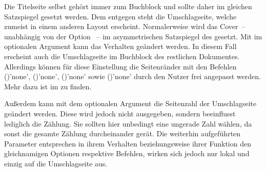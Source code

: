 \begin{Declaration*}{}
\begin{Declaration*}{}
\begin{Declaration*}{}
\begin{Declaration}
\begin{Declaration}[v2.02]{%
}
\begin{Declaration}{}
\begin{Declaration}[v2.02]{}{%
}
\begin{Declaration}[v2.03]{}{%
}
\begin{Declaration}[v2.03]{}{%
}
\begin{Declaration}[v2.03]{%
}{}
\begin{Declaration}[v2.03]{%
}{}
\begin{Declaration}[v2.03]{}{%
}
\begin{Declaration}[v2.03]{}{%
}
\begin{Declaration}[v2.03]{}{%
}
Die Titelseite selbst gehört immer zum Buchblock und sollte daher im gleichen 
Satzspiegel gesetzt werden. Dem entgegen steht die Umschlagseite, welche 
zumeist in einem anderen Layout erscheint. Normalerweise wird das Cover~-- 
unabhängig von der Option ~-- im asymmetrischen Satzspiegel 
des \CDs gesetzt. Mit  im optionalen 
Argument kann das Verhalten geändert werden. In diesem Fall erscheint auch die 
Umschlagseite im Buchblock des restlichen Dokumentes. Allerdings können für 
diese Einstellung die Seitenränder mit den Befehlen 
()'none', 
()'none', 
()'none' sowie 
()'none' 
durch den Nutzer frei angepasst werden. Mehr dazu ist im \scrguide zu finden.

Außerdem kann mit dem optionalen Argument die Seitenzahl der Umschlagseite 
geändert werden. Diese wird jedoch nicht ausgegeben, sondern beeinflusst 
lediglich die Zählung. Sie sollten hier unbedingt eine ungerade Zahl wählen, da 
sonst die gesamte Zählung durcheinander gerät. Die weiterhin aufgeführten 
Parameter entsprechen in ihrem Verhalten beziehungsweise ihrer Funktion den 
gleichnamigen Optionen respektive Befehlen, wirken sich jedoch nur lokal und 
einzig auf die Umschlagseite aus.
%
\end{Declaration}
\end{Declaration}
\end{Declaration}
\end{Declaration}
\end{Declaration}
\end{Declaration}
\end{Declaration}
\end{Declaration}
\end{Declaration}
\end{Declaration}
\end{Declaration}


\end{Declaration*}
\end{Declaration*}
\end{Declaration*}
